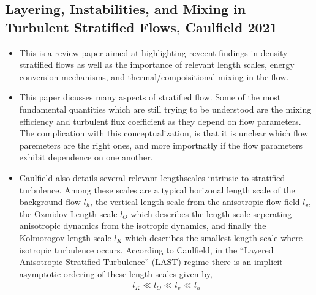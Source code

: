 \documentclass{article}
\begin{document}
    \subsection{Layering, Instabilities, and Mixing in Turbulent Stratified
    Flows, Caulfield 2021}
    \begin{itemize}
        \item This is a review paper aimed at highlighting revcent findings in
        density stratified flows as well as the importance of relevant
        length scales, energy conversion mechanisms, and thermal/compoisitional
        mixing in the flow. 
        \item This paper dicusses many aspects of stratified flow. Some of the
        most fundamental quantities which are still trying to be understood are
        the mixing efficiency and turbulent flux coefficient as they depend on
        flow parameters. The complication with this conceptualization, is that
        it is unclear which flow paremeters are the right ones, and more
        importnatly if the flow parameters exhibit dependence on one another. 
        \item Caulfield also details several relevant lengthscales intrinsic to
        stratified turbulence. Among these scales are a typical horizonal
        length scale of the background flow $l_h$, the vertical length scale
        from the anisotropic flow field $l_v$, the Ozmidov Length scale $l_O$
        which describes the length scale seperating anisotropic dynamics from
        the isotropic dynamics, and finally the Kolmorogov length scale $l_K$
        which describes the smallest length scale where isotropic turbulence
        occurs. According to Caulfield, in the ``Layered Anisotropic Stratified
        Turbulence'' (LAST) regime there is an implicit asymptotic ordering of
        these length scales given by, 
        \begin{gather*}
            l_K \ll l_O \ll l_v \ll l_h
        \end{gather*}   
    \end{itemize}
\end{document}
